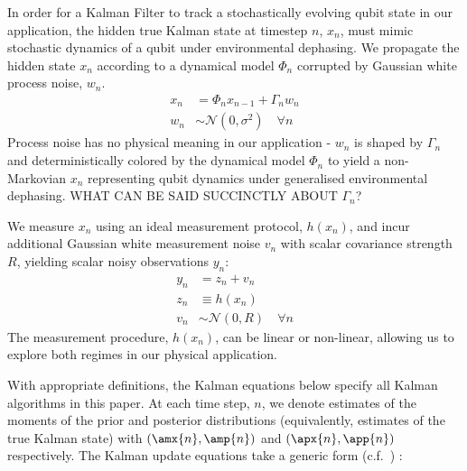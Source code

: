 In order for a Kalman Filter to track a stochastically evolving qubit state in our application, the hidden true Kalman state at timestep $n$, $x_n$, must mimic stochastic dynamics of a qubit under environmental dephasing. We propagate the hidden state $x_n$ according to a dynamical model $\Phi_n$ corrupted by Gaussian white process noise, $w_n$.  
\begin{align}
x_n & = \Phi_n x_{n-1} + \Gamma_n w_n \label{eqn:KF:dynamics} \\
w_n & \sim \mathcal{N}(0, \sigma^2) \quad \forall n 
\end{align}
Process noise has no physical meaning in our application - $w_n$ is shaped by $\Gamma_n$ and deterministically colored by the dynamical model $\Phi_n$ to yield a non-Markovian $x_n$ representing qubit dynamics under generalised environmental dephasing.  WHAT CAN BE SAID SUCCINCTLY ABOUT $\Gamma_n$?

We measure $x_n$ using an ideal measurement protocol, $h(x_n)$, and incur additional Gaussian white measurement noise $v_n$ with scalar covariance strength $R$, yielding scalar noisy observations $y_n$:
\begin{align}
y_n &= z_n + v_n \\
z_n & \equiv  h(x_n) \\
v_n & \sim \mathcal{N}(0, R) \quad \forall n
\end{align}
The measurement procedure, $h(x_n)$, can be linear or non-linear, allowing us to explore both regimes in our physical application.

With appropriate definitions, the Kalman equations below specify all Kalman algorithms in this paper. At each time step, $n$, we denote estimates of the moments of the prior and posterior distributions (equivalently, estimates of the true Kalman state) with $(\amx{n}, \amp{n})$ and $(\apx{n}, \app{n})$ respectively. The Kalman update equations take a generic form (c.f.~\cite{grewal2001theory}) :

